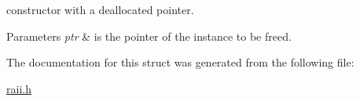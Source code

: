 constructor with a deallocated pointer. 


\begin{DoxyParams}{Parameters}
{\em ptr} & is the pointer of the instance to be freed. \\
\hline
\end{DoxyParams}


The documentation for this struct was generated from the following file\-:\begin{DoxyCompactItemize}
\item 
\hyperlink{raii_8h}{raii.\-h}\end{DoxyCompactItemize}
